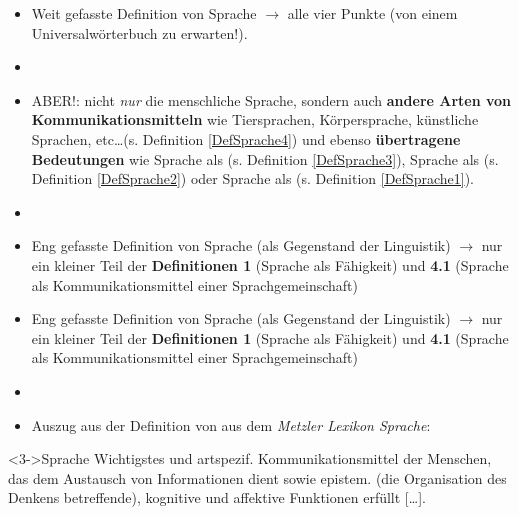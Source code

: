 \begin{frame}
		
\begin{itemize}
	\item<1-> Weit gefasste Definition von Sprache $\rightarrow$ alle vier Punkte (von einem Universalwörterbuch zu erwarten!).
	\item[]
	\item<2-> ABER!: nicht \textit{nur} die menschliche Sprache, sondern auch \textbf{andere Arten von Kommunikationsmitteln} wie Tiersprachen, Körpersprache, künstliche Sprachen, etc\dots (s. Definition \ref{DefSprache4}) und ebenso \textbf{übertragene Bedeutungen} wie Sprache als  (s. Definition 	\ref{DefSprache3}), Sprache als  (s. Definition \ref{DefSprache2}) oder Sprache als  (s. Definition \ref{DefSprache1}).
	\item[]
	\item<3-> Eng gefasste Definition von Sprache (als Gegenstand der Linguistik) $\rightarrow$ nur ein kleiner Teil der \textbf{Definitionen 1} (Sprache als Fähigkeit) und \textbf{4.1} (Sprache als Kommunikationsmittel einer Sprachgemeinschaft)
\end{itemize}
		
\end{frame}



\begin{frame}

\begin{itemize}
	\item<1-> Eng gefasste Definition von Sprache (als Gegenstand der Linguistik) $\rightarrow$ nur ein kleiner Teil der \textbf{Definitionen 1} (Sprache als Fähigkeit) und \textbf{4.1} (Sprache als Kommunikationsmittel einer Sprachgemeinschaft)
	\item[]
	\item<2-> Auszug aus der Definition von  aus dem \textit{Metzler Lexikon Sprache}:
\end{itemize}
			
\begin{block}<3->{Sprache}
    	   Wichtigstes und artspezif. Kommunikationsmittel der Menschen, das dem Austausch von Informationen dient sowie epistem. (die Organisation des Denkens betreffende), kognitive und affektive Funktionen erfüllt {[}\dots]. \citep{Glueck00a}
\end{block}
	
\end{frame}

